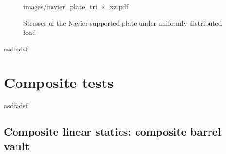 \begin{figure}[H]
{		{images/navier_plate_tri_s_xz.pdf}}
	\\
	\caption{\label{Navier_tri_s_xx_yy}Stresses of the Navier supported plate under uniformly distributed load}
\end{figure}


asdfadsf



\section{Composite tests}

asdfadsf

\subsection{Composite linear statics: composite barrel vault}

